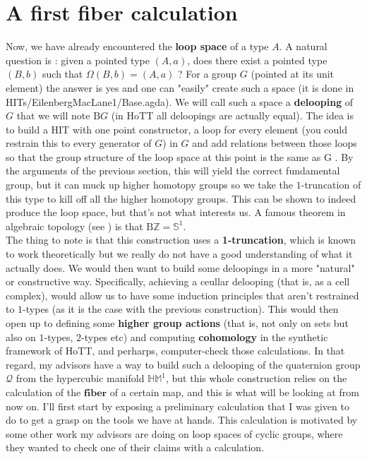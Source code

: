 \documentclass{report}
\begin{document}
\section{A first fiber calculation}
Now, we have already encountered the \textbf{loop space} of a type $A$. A natural question is : given a pointed type $(A,a)$, does there exist a pointed type $(B,b)$ such that $\Omega(B,b)=(A,a)$ ? For a group $G$ (pointed at its unit element) the answer is yes and one can "easily" create such a space (it is done in \cite{cubicalagda} HITs/EilenbergMacLane1/Base.agda). We will call such a space a \textbf{delooping} of $G$ that we will note $\mathrm{B}G$ (in HoTT all deloopings are actually equal). The idea is to build a HIT with one point constructor, a loop for every element (you could restrain this to every generator of $G$) in $G$ and add relations between those loops so that the group structure of the loop space at this point is the same as G . By the arguments of the previous section, this will yield the correct fundamental group, but it can muck up higher homotopy groups so we take the $1$-truncation of this type to kill off all the higher homotopy groups. This can be shown to indeed produce the loop space, but that's not what interests us. A famous theorem in algebraic topology (see \cite{hott}) is that $\mathrm{B}\mathbb Z = \mathbb{S}^1$.\\
The thing to note is that this construction uses a \textbf{1-truncation}, which is known to work theoretically but we really do not have a good understanding of what it actually does. We would then want to build some deloopings in a more "natural" or constructive way. Specifically, achieving a ceullar delooping (that is, as a cell complex), would allow us to have some induction principles that aren't restrained to $1$-types (as it is the case with the previous construction). This would then open up to defining some \textbf{higher group actions} (that is, not only on sets but also on $1$-types, $2$-types etc) and computing \textbf{cohomology} in the synthetic framework of HoTT, and perharps, computer-check those calculations. In that regard, my advisors have a way to build such a delooping of the quaternion group $\mathcal Q$ from the hypercubic manifold $\mathbb{HM}^1$, but this whole construction relies on the calculation of the $\textbf{fiber}$ of a certain map, and this is what will be looking at from now on. I'll first start by exposing a preliminary calculation that I was given to do to get a grasp on the tools we have at hands. This calculation is motivated by some other work my advisors are doing on loop spaces of cyclic groups, where they wanted to check one of their claims with a calculation.
\end{document}
